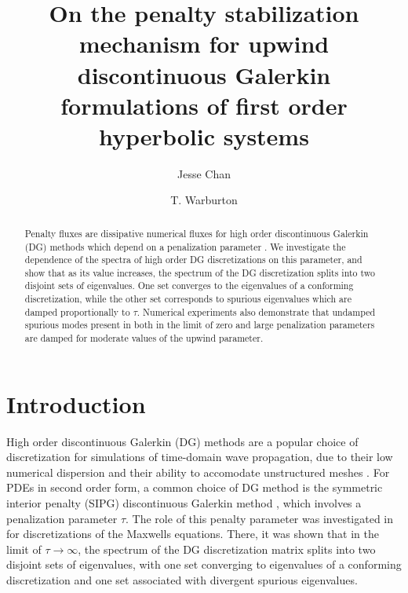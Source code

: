 \documentclass[preprint,10pt]{elsarticle}
\date{}
\newcommand{\note}[1]{{\color{blue}#1}}
\begin{document}
\begin{frontmatter}
\title{On the \note{penalty stabilization mechanism for upwind discontinuous Galerkin formulations of first order hyperbolic systems}}

\author[rice]{Jesse Chan}
\author[vt]{T. Warburton}
\address[rice]{Department of Computational and Applied Mathematics, Rice University, 6100 Main St, Houston, TX, 77005}
\address[vt]{Department of Mathematics, Virginia Tech, 225 Stanger Street, Blacksburg, VA 24061-0123}

\address{}

\begin{abstract}
Penalty fluxes are dissipative numerical fluxes for high order discontinuous Galerkin (DG) methods which depend on a penalization parameter \cite{warburton2013low, ye2016discontinuous}.  We investigate the dependence of the spectra of high order DG discretizations on this parameter, and show that as its value increases, the \note{spectrum} of the DG discretization splits into two disjoint sets of eigenvalues.  One set converges to the eigenvalues of a conforming discretization, while the other set corresponds to spurious eigenvalues which are damped proportionally to $\tau$.  Numerical experiments also demonstrate that undamped spurious modes present in both in the limit of zero and large penalization parameters are damped for moderate values of the upwind parameter.  
\end{abstract}
\end{frontmatter}


\section{Introduction}

High order discontinuous Galerkin (DG) methods are a popular choice of discretization for simulations of time-domain wave propagation, due to their low numerical dispersion and their ability to accomodate unstructured meshes \cite{grote2006discontinuous,hesthaven2007nodal}.  For PDEs in second order form, a common choice of DG method is the symmetric interior penalty (SIPG) discontinuous Galerkin method \cite{riviere2008discontinuous}, which involves a penalization parameter $\tau$.  The role of this penalty parameter was investigated in \cite{Warburton20063205} for discretizations of the Maxwells equations.  There, it was shown that in the limit of $\tau\rightarrow\infty$, the \note{spectrum} of the DG discretization matrix splits into two disjoint sets of eigenvalues, with one set converging to eigenvalues of a conforming discretization and one set associated with divergent spurious eigenvalues.  
\end{document}
